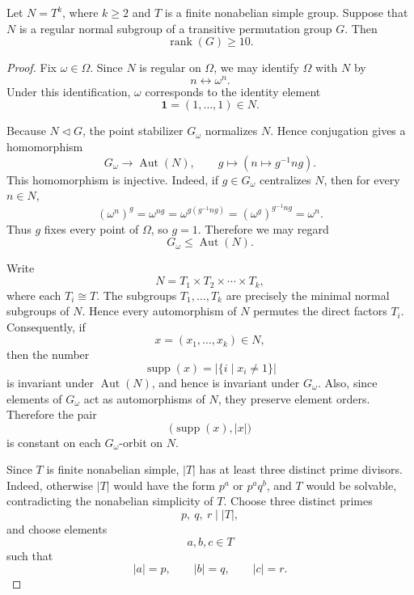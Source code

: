 \begin{proposition}
    Let \(N=T^k\), where \(k\geq 2\) and \(T\) is a finite nonabelian simple group.
    Suppose that \(N\) is a regular normal subgroup of a transitive permutation group
    \(G\). Then
    \[
        \operatorname{rank}(G)\geq 10.
    \]
    \end{proposition}

    \begin{proof}
        Fix \(\omega\in \Omega\). Since \(N\) is regular on \(\Omega\), we may identify
        \(\Omega\) with \(N\) by
        \[
            n \longleftrightarrow \omega^n.
        \]
        Under this identification, \(\omega\) corresponds to the identity element
        \[
            \mathbf{1}=(1,\ldots,1)\in N.
        \]
        
        Because \(N\lhd G\), the point stabilizer \(G_\omega\) normalizes \(N\). Hence
        conjugation gives a homomorphism
        \[
            G_\omega \longrightarrow \operatorname{Aut}(N),
            \qquad
            g\longmapsto (n\mapsto g^{-1}ng).
        \]
        This homomorphism is injective. Indeed, if \(g\in G_\omega\) centralizes \(N\),
        then for every \(n\in N\),
        \[
            (\omega^n)^g
            =
            \omega^{ng}
            =
            \omega^{g(g^{-1}ng)}
            =
            (\omega^g)^{g^{-1}ng}
            =
            \omega^n.
        \]
        Thus \(g\) fixes every point of \(\Omega\), so \(g=1\). Therefore we may regard
        \[
            G_\omega \leq \operatorname{Aut}(N).
        \]
        
        Write
        \[
            N=T_1\times T_2\times \cdots \times T_k,
        \]
        where each \(T_i\cong T\). The subgroups \(T_1,\ldots,T_k\) are precisely the
        minimal normal subgroups of \(N\). Hence every automorphism of \(N\) permutes
        the direct factors \(T_i\). Consequently, if
        \[
            x=(x_1,\ldots,x_k)\in N,
        \]
        then the number
        \[
            \operatorname{supp}(x)
            =
            |\{i\mid x_i\neq 1\}|
        \]
        is invariant under \(\operatorname{Aut}(N)\), and hence is invariant under
        \(G_\omega\). Also, since elements of \(G_\omega\) act as automorphisms of \(N\),
        they preserve element orders. Therefore the pair
        \[
            \bigl(\operatorname{supp}(x), |x|\bigr)
        \]
        is constant on each \(G_\omega\)-orbit on \(N\).
        
        Since \(T\) is finite nonabelian simple, \(|T|\) has at least three distinct prime
        divisors. Indeed, otherwise \(|T|\) would have the form \(p^a\) or \(p^aq^b\), and
        \(T\) would be solvable, contradicting the nonabelian simplicity of \(T\). Choose
        three distinct primes
        \[
            p,\ q,\ r \mid |T|,
        \]
        and choose elements
        \[
            a,b,c\in T
        \]
        such that
        \[
            |a|=p,\qquad |b|=q,\qquad |c|=r.
        \]
        

\end{proof}
